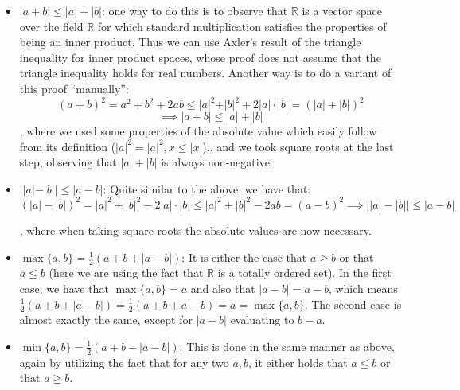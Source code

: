 \begin{solution}
    \begin{itemize}
        \item $\lvert a + b \rvert \leq \lvert a \rvert + \lvert b \rvert$: one way to do this is to observe that $\mathbb{R}$ is a vector space over the field $\mathbb{R}$ for which standard multiplication satisfies the properties of being an inner product. Thus we can use Axler's result of the triangle inequality for inner product spaces, whose proof does not assume that the triangle inequality holds for real numbers. Another way is to do a variant of this proof ``manually'':
        $$(a+b)^2 = a^2 + b^2 + 2ab \leq \lvert a \rvert^2 + \rvert b \rvert^2 +2 \lvert a \rvert \cdot \lvert b \rvert = (\lvert a \rvert + \lvert b \rvert)^2$$
        $$\implies \lvert a + b \rvert \leq \lvert a \rvert + \lvert b \rvert$$
        , where we used some properties of the absolute value which easily follow from its definition ($\lvert a \rvert^2 = \lvert a \rvert^2, x \leq \lvert x \rvert$)., and we took square roots at the last step, observing that $\lvert a \rvert + \lvert b \rvert$ is always non-negative.
        \item $\bigl\lvert \lvert a \lvert - \lvert b \rvert \bigr\rvert \leq \lvert a - b \rvert$: Quite similar to the above, we have that:
        $$(\lvert a \rvert - \lvert b \rvert)^2 = \lvert a \rvert^2 + \lvert b \rvert^2 - 2\lvert a \rvert \cdot \lvert b \rvert \leq \lvert a \rvert^2 + \lvert b \rvert^2 - 2ab = (a - b)^2 \implies \bigl\lvert \lvert a \rvert - \lvert b \rvert \bigr\rvert \leq \lvert a - b \rvert$$

        , where when taking square roots the absolute values are now necessary.

        \item $\max\{a, b\} = \frac{1}{2}(a + b + \lvert a -b \rvert)$: It is either the case that $a \geq b$  or that $a \leq b$ (here we are using the fact that $\mathbb{R}$ is a totally ordered set). In the first case, we have that $\max\{a, b\} = a$ and also that $\lvert a - b \rvert = a -b$, which means $\frac{1}{2}(a + b + \lvert a - b \rvert) = \frac{1}{2}(a + b + a - b) = a = \max\{a, b\}$. The second case is almost exactly the same, except for $\lvert a - b \rvert$ evaluating to $b - a$.
        \item $\min\{a, b\} = \frac{1}{2}(a + b - \lvert a - b \rvert)$: This is done in the same manner as above, again by utilizing the fact that for any two $a, b$, it either holds that $a \leq b$ or that $a \geq b$.
    \end{itemize}
\end{solution}

